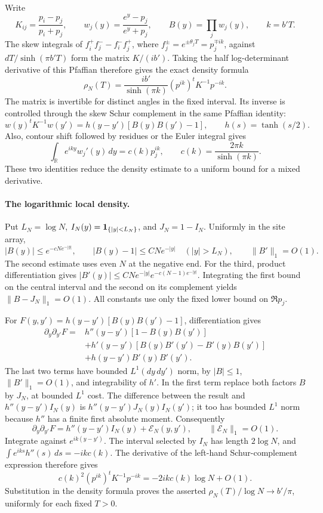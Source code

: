 Write
\[
 K_{ij}=\frac{p_i-p_j}{p_i+p_j},\qquad
 w_j(y)=\frac{e^y-p_j}{e^y+p_j},\qquad B(y)=\prod_jw_j(y),
 \qquad k=b'T.
\]
The skew integrals of
\(f_i^+f_j^--f_i^-f_j^+\), where
\(f_j^\pm=e^{\pm\theta_jT}=p_j^{\mp ik}\), against
\(dT/\sinh(\pi b'T)\) form the matrix \(K/(ib')\).
Taking the half log-determinant derivative of this Pfaffian therefore
gives the exact density formula
\[
 \rho_N(T)=\frac{ib'}{\sinh(\pi k)}
              (p^{ik})^tK^{-1}p^{-ik}.
\]
The matrix is invertible for distinct angles in the fixed interval.
Its inverse is controlled through the skew Schur complement in the
same Pfaffian identity:
\[
 w(y)^tK^{-1}w(y')=
       h(y-y')[B(y)B(y')-1],\qquad h(s)=\tanh(s/2).
\]
Also, contour shift followed by residues or the Euler integral gives
\[
 \int_{\mathbb R}e^{iky}w_j'(y)\,dy=c(k)p_j^{ik},
 \qquad c(k)=\frac{2\pi k}{\sinh(\pi k)}.
\]
These two identities reduce the density estimate to a uniform bound
for a mixed derivative.

\paragraph{The logarithmic local density.}
Put \(L_N=\log N\), \(I_N(y)={\bf1}_{\{|y|<L_N\}}\), and
\(J_N=1-I_N\). Uniformly in the site array,
\[
 |B(y)|\le e^{-cNe^{-|y|}},\qquad
 |B(y)-1|\le CNe^{-|y|}\quad (|y|>L_N),\qquad
 \|B'\|_1=O(1).
\]
The second estimate uses even \(N\) at the negative end. For the third,
product differentiation gives
\(|B'(y)|\le CNe^{-|y|}e^{-c(N-1)e^{-|y|}}\).
Integrating the first bound on the central interval and the second on
its complement yields
\(\|B-J_N\|_1=O(1)\). All constants use only the fixed lower bound
on \(\Re p_j\).

For \(F(y,y')=h(y-y')[B(y)B(y')-1]\), differentiation gives
\[
 \begin{aligned}
 \partial_y\partial_{y'}F
 ={}&h''(y-y')[1-B(y)B(y')]\\
 &+h'(y-y')[B(y)B'(y')-B'(y)B(y')]\\
 &+h(y-y')B'(y)B'(y').
 \end{aligned}
\]
The last two terms have bounded \(L^1(dy\,dy')\) norm, by
\(|B|\le1\), \(\|B'\|_1=O(1)\), and integrability of \(h'\).
In the first term replace both factors \(B\) by \(J_N\), at bounded
\(L^1\) cost. The difference between the result and
\(h''(y-y')I_N(y)\) is
\(h''(y-y')J_N(y)I_N(y')\); it too has bounded \(L^1\) norm because
\(h''\) has a finite first absolute moment. Consequently
\[
 \partial_y\partial_{y'}F
     =h''(y-y')I_N(y)+\mathcal E_N(y,y'),\qquad \|\mathcal E_N\|_1=O(1).
\]
Integrate against \(e^{ik(y-y')}\). The interval selected by \(I_N\)
has length \(2\log N\), and
\(\int e^{iks}h''(s)\,ds=-ikc(k)\). The derivative of the left-hand
Schur-complement expression therefore gives
\[
 c(k)^2(p^{ik})^tK^{-1}p^{-ik}
       =-2ikc(k)\log N+O(1).
\]
Substitution in the density formula proves the asserted
\(\rho_N(T)/\log N\to b'/\pi\), uniformly for each fixed \(T>0\).

